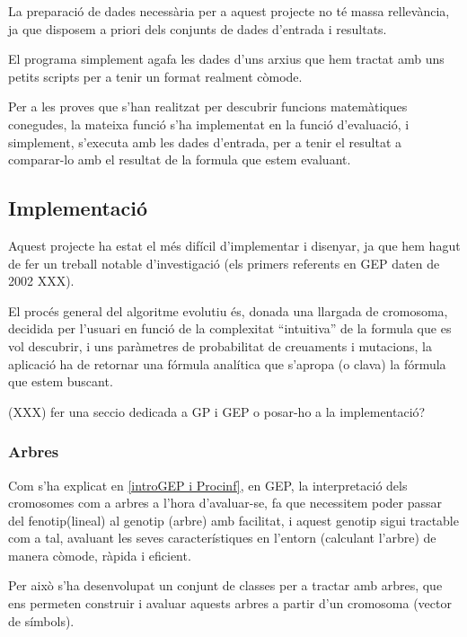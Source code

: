 \documentclass[titlepage,a4paper,12pt]{book}
\begin{document}
La preparació de dades necessària per a aquest projecte no té massa rellevància,
ja que disposem a priori dels conjunts de dades d'entrada i resultats.

El programa simplement agafa les dades d'uns arxius que hem tractat amb uns
petits scripts per a tenir un format realment còmode.

Per a les proves que s'han realitzat per descubrir funcions matemàtiques
conegudes, la mateixa funció s'ha implementat en la funció d'evaluació, i
simplement, s'executa amb les dades d'entrada, per a tenir el resultat a
comparar-lo amb el resultat de la formula que estem evaluant.


\subsection{Implementació} %
\label{sub:GImplementacio}

Aquest projecte ha estat el més difícil d'implementar i disenyar, ja que hem
hagut de fer un treball notable d'investigació (els primers referents en GEP
daten de 2002 XXX).

El procés general del algoritme evolutiu és, donada una llargada de cromosoma,
decidida per l'usuari en funció de la complexitat ``intuitiva'' de la formula
que es vol descubrir, i uns paràmetres de probabilitat de creuaments i
mutacions, la aplicació ha de retornar una fórmula analítica que s'apropa (o
clava) la fórmula que estem buscant.

(XXX) fer una seccio dedicada a GP i GEP o posar-ho a la implementació?

\subsubsection{Arbres} %
\label{ssub:Arbres}

Com s'ha explicat en \ref{introGEP i Procinf}, en GEP, la interpretació dels
cromosomes com a arbres a l'hora d'avaluar-se, fa que necessitem poder passar
del fenotip(lineal) al genotip (arbre) amb facilitat, i aquest genotip sigui
tractable com a tal, avaluant les seves característiques en l'entorn (calculant
l'arbre) de manera còmode, ràpida i eficient.

Per això s'ha desenvolupat un conjunt de classes per a tractar amb arbres, que
ens permeten construir i avaluar aquests arbres a partir d'un cromosoma (vector
de símbols).
\end{document}

